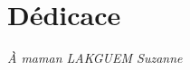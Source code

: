 \chapter*{Dédicace}
\vspace*{5cm}
\begin{flushright}
    \large\em\null\vskip1in 
     \`{A} maman LAKGUEM Suzanne \vfill
  \end{flushright}